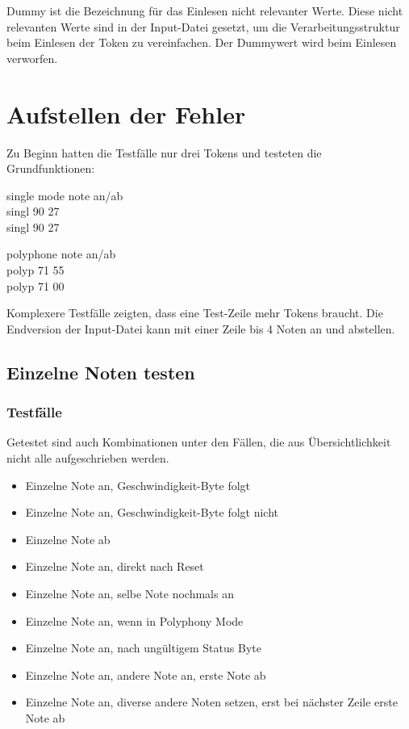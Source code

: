 Dummy ist die Bezeichnung für das Einlesen nicht relevanter Werte. Diese nicht relevanten Werte sind in der Input-Datei gesetzt, um die Verarbeitungsstruktur beim Einlesen der Token zu vereinfachen. Der Dummywert wird beim Einlesen verworfen.
 
\section{Aufstellen der Fehler}\label{sec.testbench_fehler} 

Zu Beginn hatten die Testfälle nur drei Tokens und testeten die Grundfunktionen:

single mode note an/ab\\
singl 90 27\\ 
singl 90 27

polyphone note an/ab\\
polyp 71 55\\
polyp 71 00

Komplexere Testfälle zeigten, dass eine Test-Zeile mehr Tokens braucht. Die Endversion der Input-Datei kann mit einer Zeile bis 4 Noten an und abstellen.

\subsection{Einzelne Noten testen}
 
\subsubsection{Testfälle}

Getestet sind auch Kombinationen unter den Fällen, die aus Übersichtlichkeit nicht alle aufgeschrieben werden.

\begin{itemize}
	\item Einzelne Note an, Geschwindigkeit-Byte folgt
	\item Einzelne Note an, Geschwindigkeit-Byte folgt nicht
	\item Einzelne Note ab
	\item Einzelne Note an, direkt nach Reset
	\item Einzelne Note an, selbe Note nochmals an
	\item Einzelne Note an, wenn in Polyphony Mode
	\item Einzelne Note an, nach ungültigem Status Byte
	\item Einzelne Note an, andere Note an, erste Note ab
	\item Einzelne Note an, diverse andere Noten setzen, erst bei nächster Zeile erste Note ab
\end{itemize}

